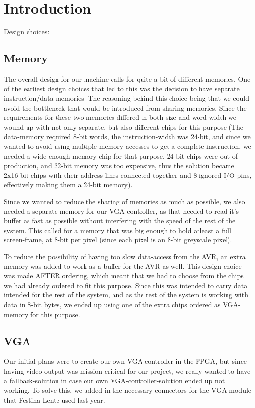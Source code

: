 \section {Introduction}

Design choices: \\
\subsection {Memory}
The overall design for our machine calls for quite a bit of different memories. One of the
earliest design choices that led to this was the decision to have separate instruction/data-memories.
The reasoning behind this choice being that we could avoid the bottleneck that would be introduced
from sharing memories. Since the requirements for these two memories differed in both size and word-width 
we wound up with not only separate, but also different chips for this purpose (The data-memory required
8-bit words, the instruction-width was 24-bit, and since we wanted to avoid using multiple memory accesses
to get a complete instruction, we needed a wide enough memory chip for that purpose. 24-bit chips were out of
production, and 32-bit memory was too expensive, thus the solution became 2x16-bit chips with their address-lines
connected together and 8 ignored I/O-pins, effectively making them a 24-bit memory).

Since we wanted to reduce the sharing of memories as much as possible, we also needed a separate memory for
our VGA-controller, as that needed to read it's buffer as fast as possible without interfering with the speed
of the rest of the system. This called for a memory that was big enough to hold atleast a full screen-frame,
at 8-bit per pixel (since each pixel is an 8-bit greyscale pixel).

To reduce the possibility of having too slow data-access from the AVR, an extra memory was added to work as
a buffer for the AVR as well. This design choice was made AFTER ordering, which meant that we had to choose from
the chips we had already ordered to fit this purpose. Since this was intended to carry data intended for the rest
of the system, and as the rest of the system is working with data in 8-bit bytes, we ended up using one of the
extra chips ordered as VGA-memory for this purpose.

\subsection{VGA}
Our initial plans were to create our own VGA-controller in the FPGA, but since having video-output was mission-critical
for our project, we really wanted to have a fallback-solution in case our own VGA-controller-solution ended up not working.
To solve this, we added in the necessary connectors for the VGA-module that Festina Lente used last year.

